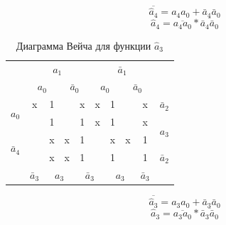 \documentclass[a4paper,14pt]{article}
\begin{document}
$$\overline{\hat{a}_4} = a_4 a_0 + \bar{a}_4\bar{a}_0$$
$$\hat{a}_4 = \overline{a_4 a_0} * \overline{\bar{a}_4\bar{a}_0}$$


\begin{table}[H]
				\begin{center}
		\caption{\label{tab:a3_preobr} Диаграмма Вейча для функции $\hat{a}_3$}


	\begin{tabular}{cccccccccc}
		& \multicolumn{4}{c}{$a_1$} & \multicolumn{4}{c}{$\bar{a}_1$} &  \\
		& \multicolumn{2}{c}{$a_0$} & \multicolumn{2}{c}{$\bar{a}_0$} & \multicolumn{2}{c}{$a_0$} & \multicolumn{2}{c}{$\bar{a}_0$} &  \\ \cline{2-9}
		\multicolumn{1}{c|}{\multirow{2}{*}{$a_0$}} & \multicolumn{1}{c|}{x} & \multicolumn{1}{c|}{1} & \multicolumn{1}{c|}{} & \multicolumn{1}{c|}{x} & \multicolumn{1}{c|}{x} & \multicolumn{1}{c|}{1} & \multicolumn{1}{c|}{} & \multicolumn{1}{c|}{x} & $\bar{a}_2$ \\ \cline{2-9}
		\multicolumn{1}{c|}{} & \multicolumn{1}{c|}{} & \multicolumn{1}{c|}{1} & \multicolumn{1}{c|}{} & \multicolumn{1}{c|}{1} & \multicolumn{1}{c|}{x} & \multicolumn{1}{c|}{1} & \multicolumn{1}{c|}{} & \multicolumn{1}{c|}{x} & \multirow{2}{*}{$a_3$} \\ \cline{2-9}
		\multicolumn{1}{c|}{\multirow{2}{*}{$\bar{a}_4$}} & \multicolumn{1}{c|}{} & \multicolumn{1}{c|}{x} & \multicolumn{1}{c|}{x} & \multicolumn{1}{c|}{1} & \multicolumn{1}{c|}{} & \multicolumn{1}{c|}{x} & \multicolumn{1}{c|}{x} & \multicolumn{1}{c|}{1} &  \\ \cline{2-9}
		\multicolumn{1}{c|}{} & \multicolumn{1}{c|}{} & \multicolumn{1}{c|}{x} & \multicolumn{1}{c|}{x} & \multicolumn{1}{c|}{1} & \multicolumn{1}{c|}{} & \multicolumn{1}{c|}{1} & \multicolumn{1}{c|}{} & \multicolumn{1}{c|}{1} & $\bar{a}_2$ \\ \cline{2-9}
		& $\bar{a}_3$ & \multicolumn{2}{c}{$a_3$} & \multicolumn{2}{c}{$\bar{a}_3$} & \multicolumn{2}{c}{$a_3$} & $\bar{a}_3$ & 
	\end{tabular}
\end{center}
\end{table}

$$\overline{\hat{a}_3} = a_3 a_0 + \bar{a}_3\bar{a}_0$$
$$\hat{a}_3 = \overline{a_3 a_0} * \overline{\bar{a}_3\bar{a}_0}$$


\end{document}
